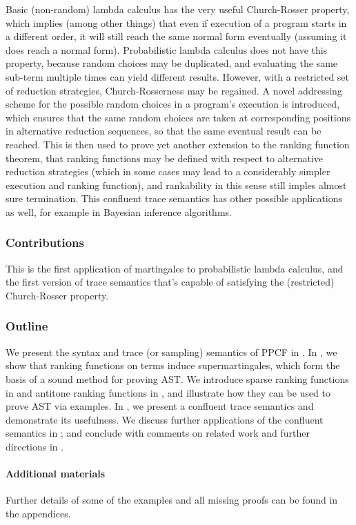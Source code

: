 Basic (non-random) lambda calculus has the very useful Church-Rosser property, which implies (among other things) that even if execution of a program starts in a different order, it will still reach the same normal form eventually (assuming it does reach a normal form). Probabilistic lambda calculus does not have this property, because random choices may be duplicated, and evaluating the same sub-term multiple times can yield different results. However, with a restricted set of reduction strategies, Church-Rosserness may be regained. A novel addressing scheme for the possible random choices in a program's execution is introduced, which ensures that the same random choices are taken at corresponding positions in alternative reduction sequences, so that the same eventual result can be reached. This is then used to prove yet another extension to the ranking function theorem, that ranking functions may be defined with respect to alternative reduction strategies (which in some cases may lead to a considerably simpler execution and ranking function), and rankability in this sense still imples almost sure termination. This confluent trace semantics has other possible applications as well, for example in Bayesian inference algorithms.

\subsubsection*{Contributions}

This is the first application of martingales to probabilistic lambda calculus, and the first version of trace semantics that's capable of satisfying the (restricted) Church-Rosser property.


\subsubsection*{Outline}

We present the syntax and trace (or sampling) semantics of PPCF in .
In , we show that ranking functions on terms induce supermartingales, which form the basis of a sound method for proving AST.
We introduce sparse ranking functions in  and antitone ranking functions in , and illustrate how they can be used to prove AST via examples. 
In , we present a confluent trace semantics and demonstrate its usefulness.
We discuss further applications of the confluent semantics in ; and conclude with comments on related work and further directions in .

\paragraph*{Additional materials} Further details of some of the examples and all missing proofs can be found in the appendices.
